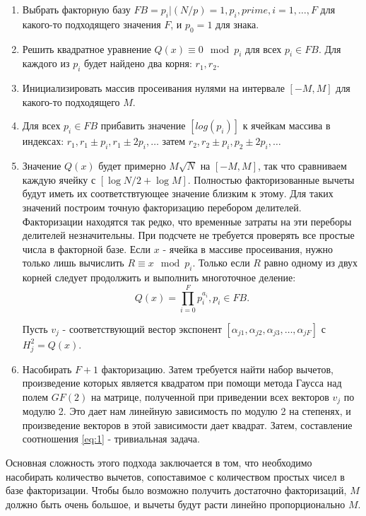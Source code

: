 \documentclass[a4paper,12pt]{report}
\begin{document}
\begin{enumerate}[label=\roman*]
	\item Выбрать факторную базу $FB = {p_i | (N/p) = 1, p_i, prime, i = 1, \ldots, F}$ для какого-то подходящего значения $F$, и $p_0 = 1$ для знака.
	\item Решить квадратное уравнение $Q(x) \equiv 0 \mod p_i$ для всех $p_i \in FB$. Для каждого из $p_i$ будет найдено два корня: $r_1, r_2$.
	\item Инициализировать массив просеивания нулями на интервале $[-M, M]$ для какого-то подходящего $M$.
	\item Для всех $p_i \in FB$ прибавить значение $[log(p_i)]$ к ячейкам массива в индексах: $r_1, r_1 \pm p_i, r_1 \pm 2p_i, \ldots$ затем $r_2, r_2 \pm p_i, p_2 \pm 2p_i, \ldots$
	\item Значение $Q(x)$ будет примерно $M\sqrt{N}$ на $[-M, M]$, так что сравниваем каждую ячейку с  $[\log{N}/2 + \log{M}]$. Полностью факторизованные вычеты будут иметь их соответствтующее значение близким к этому. Для таких значений построим точную факторизацию перебором делителей. Факторизации находятся так редко, что временные затраты на эти переборы делителей незначительны. При подсчете не требуется проверять все простые числа в факторной базе. Если $x$ - ячейка в массиве просеивания, нужно только лишь вычислить $R \equiv x \mod p_i$. Только если $R$ равно одному из двух корней следует продолжить и выполнить многоточное деление:
\begin{equation}\label{eq:3}
Q(x) = \prod_{i = 0}^{F}p_i^{a_i}, p_i \in FB.
\end{equation}

Пусть $v_j$ - соответствующий вестор экспонент $[\alpha_{j1}, \alpha_{j2}, \alpha_{j3}, \ldots, \alpha_{jF}]$ с $H_{j}^2 = Q(x)$. 
	\item Насобирать $F+1$ факторизацию. Затем требуется найти набор вычетов, произведение которых является квадратом при помощи метода Гаусса над полем $GF(2)$ на матрице, полученной при приведении всех векторов $v_j$ по модулю 2. Это дает нам линейную зависимость по модулю 2 на степенях, и произведение векторов в этой зависимости дает квадрат. Затем, составление соотношения \eqref{eq:1} - тривиальная задача.

\end{enumerate}
Основная сложность этого подхода заключается в том, что необходимо насобирать количество вычетов, сопоставимое с количеством простых чисел в базе факторизации. Чтобы было возможно получить достаточно факторизаций, $M$ должно быть очень большое, и вычеты будут расти линейно пропорционально $M$. 
\end{document}
